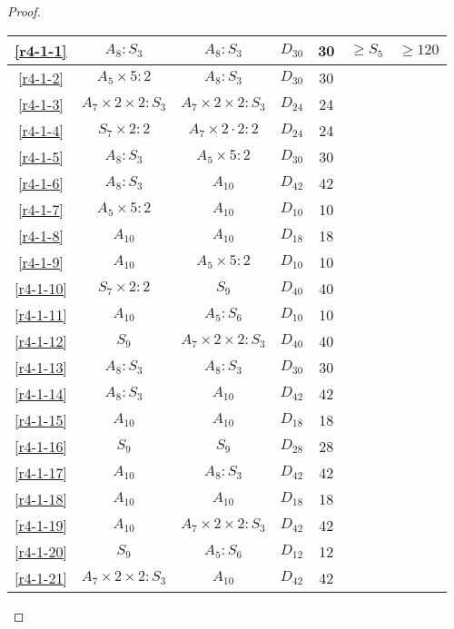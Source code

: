 \begin{proof}
\begin{table}[H]
\begin{tabular}{|c|c|c|c|c|c|c|}
    \ref{r4-1-1} & $A_8 : S_3$ & $A_8 : S_3$ & $D_{30}$ & 30 & $\ge S_5$ & $\ge 120$ \\ \hline
    \ref{r4-1-2} & $A_5 \times 5 : 2$ & $A_8 : S_3$ & $D_{30}$ & 30 &  \\ \hline
    \ref{r4-1-3} & $A_7 \times 2 \times 2 : S_3$ & $A_7 \times 2 \times 2 : S_3$ & $D_{24}$ & 24 &  \\ \hline
    \ref{r4-1-4} & $S_7 \times 2 : 2$ & $A_7  \times 2 \cdot 2 : 2$ & $D_{24}$ & 24 &  \\ \hline
    \ref{r4-1-5} & $A_8 : S_3$ & $A_5 \times 5 : 2$ & $D_{30}$ & 30 &  \\ \hline
    \ref{r4-1-6} & $A_8 : S_3$ & $A_{10}$ & $D_{42}$ & 42 &  \\ \hline
    \ref{r4-1-7} & $A_5 \times 5 : 2$ & $A_{10}$ & $D_{10}$ & 10 &  \\ \hline
    \ref{r4-1-8} & $A_{10}$ & $A_{10}$ & $D_{18}$ & 18 &  \\ \hline
    \ref{r4-1-9} & $A_{10}$ & $A_5 \times 5 : 2$ & $D_{10}$ & 10 &  \\ \hline
    \ref{r4-1-10}& $S_7 \times 2:2$ & $S_9$ & $D_{40}$ & 40 &  \\ \hline
    \ref{r4-1-11}& $A_{10}$ & $A_5 : S_6$ & $D_{10}$ & 10 &  \\ \hline
    \ref{r4-1-12}& $S_9$ & $A_7 \times 2 \times 2:S_3$ & $D_{40}$ & 40 &  \\ \hline
    \ref{r4-1-13}& $A_8 : S_3$ & $A_8 : S_3$ & $D_{30}$ & 30 & \\ \hline
    \ref{r4-1-14}& $A_8 : S_3$ & $A_{10}$ & $D_{42}$ & 42 & \\ \hline
    \ref{r4-1-15}& $A_{10}$ & $A_{10}$ & $D_{18}$ & 18 & \\ \hline
    \ref{r4-1-16}& $S_9$ & $S_9$ & $D_{28}$ & 28 & \\ \hline
    \ref{r4-1-17}& $A_{10}$ & $A_8 : S_3$ & $D_{42}$ & 42 & \\ \hline
    \ref{r4-1-18}& $A_{10}$ & $A_{10}$ & $D_{18}$ & 18 & \\ \hline
    \ref{r4-1-19}& $A_{10}$ & $A_7 \times 2 \times 2 : S_3$ & $D_{42}$ & 42 & \\ \hline
    \ref{r4-1-20}& $S_9$ & $A_5 : S_6$ & $D_{12}$ & 12 & \\ \hline
    \ref{r4-1-21}& $A_7 \times 2 \times 2 : S_{3}$ & $A_{10}$ & $D_{42}$ & 42 & \\ \hline

  \end{tabular}
\end{table}


\end{proof}
